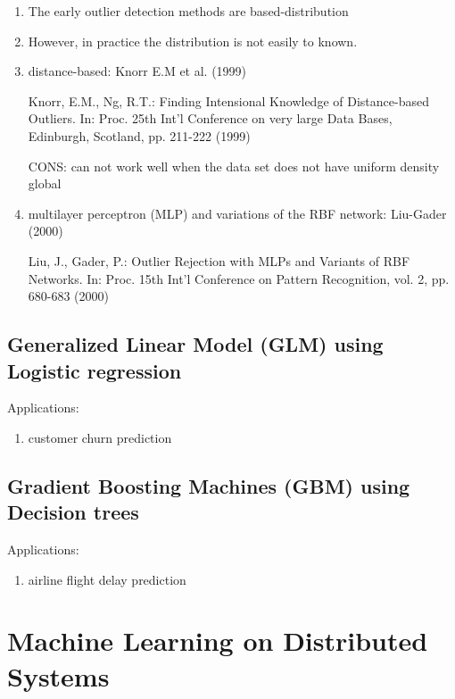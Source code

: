 \begin{enumerate}
  \item  The early outlier detection methods are based-distribution

  \item However, in practice the distribution is not easily to known.

  \item  distance-based: Knorr E.M et al. (1999)
  
Knorr, E.M., Ng, R.T.: Finding Intensional Knowledge of Distance-based Outliers.
In: Proc. 25th Int'l Conference on very large Data Bases, Edinburgh, Scotland, pp.
211-222 (1999)

CONS: can not work well when the data set does not have uniform density global

  \item multilayer perceptron (MLP) and variations of the RBF network: Liu-Gader
  (2000)
  
Liu, J., Gader, P.: Outlier Rejection with MLPs and Variants of RBF Networks.
In: Proc. 15th Int'l Conference on Pattern Recognition, vol. 2, pp. 680-683 (2000)

\end{enumerate}



\section{Generalized Linear Model (GLM) using Logistic regression}
\label{sec:GLM}
\label{sec:Gradient-Boosting}

Applications:
\begin{enumerate}
  \item customer churn prediction
\end{enumerate}

\section{Gradient Boosting Machines (GBM) using Decision trees}
\label{sec:GBM}

Applications:
\begin{enumerate}
  \item airline flight delay prediction
\end{enumerate}


\chapter{Machine Learning on Distributed Systems}
\label{chap:machine_learning_distributed_system}

